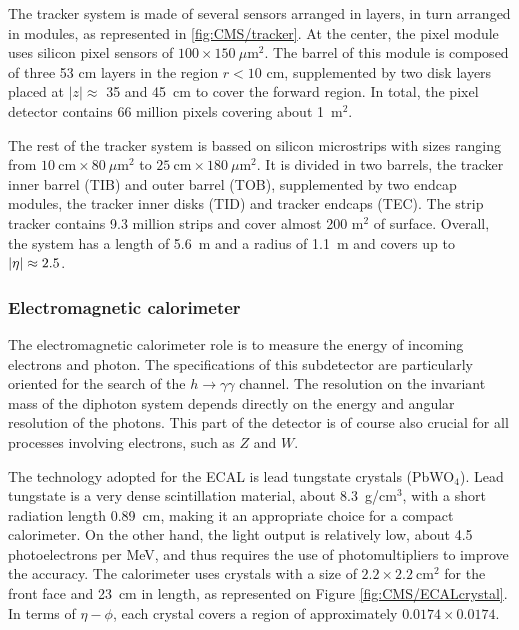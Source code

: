 
        The tracker system is made of several sensors arranged in layers, in turn arranged
        in modules, as represented in \ref{fig:CMS/tracker}. At the center, the pixel module
        uses silicon pixel sensors of $100 \times 150~\mu$m$^2$. The barrel of this module
        is composed of three 53 cm layers in the region $r < 10$ cm, supplemented by two
        disk layers placed at $\left|z\right| \approx$ 35 and 45~cm to cover the forward
        region. In total, the pixel detector contains 66 million pixels covering about 1~m$^2$.

        The rest of the tracker system is bassed on silicon microstrips with sizes ranging
        from $10~\text{cm} \times 80~\mu\text{m}^2$ to $25~\text{cm} \times 180~\mu\text{m}^2$.
        It is divided in two barrels, the tracker inner barrel (TIB) and outer barrel (TOB),
        supplemented by two endcap modules, the tracker inner disks (TID) and tracker endcaps
        (TEC). The strip tracker contains 9.3 million strips and cover almost 200 m$^2$ of
        surface. Overall, the system has a length of 5.6~m and a radius of 1.1~m and covers
        up to $\left| \eta \right| \approx 2.5$.

            \subsubsection{Electromagnetic calorimeter}

        The electromagnetic calorimeter role is to measure the energy of incoming electrons
        and photon. The specifications of this subdetector are particularly oriented for
        the search of the $h \rightarrow \gamma \gamma$ channel. The resolution on the
        invariant mass of the diphoton system depends directly on the energy and angular
        resolution of the photons. This part of the detector is of course also crucial for
        all processes involving electrons, such as $Z$ and $W$.

        The technology adopted for the ECAL is lead tungstate crystals (PbWO$_4$). Lead
        tungstate is a very dense scintillation material, about 8.3~g/cm$^3$, with a short
        radiation length 0.89~cm, making it an appropriate choice for a compact calorimeter.
        On the other hand, the light output is relatively low, about 4.5 photoelectrons
        per MeV, and thus requires the use of photomultipliers to improve the accuracy.
        The calorimeter uses crystals with a size of $2.2\times2.2~\text{cm}^2$
        for the front face and 23~cm in length, as represented on Figure \ref{fig:CMS/ECALcrystal}.
        In terms of $\eta-\phi$, each crystal covers a region of approximately $0.0174
        \times 0.0174$.

